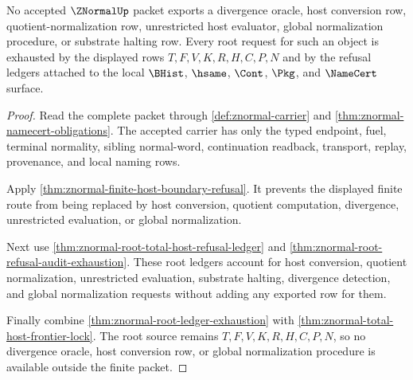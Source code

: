 \begin{theorem}
\label{thm:znormal-root-forbidden-host-conversion-exclusion}
No accepted $\ZNormalUp$ packet exports a divergence oracle, host conversion row, quotient-normalization row, unrestricted host evaluator, global normalization procedure, or substrate halting row. Every root request for such an object is exhausted by the displayed rows $T,F,V,K,R,H,C,P,N$ and by the refusal ledgers attached to the local $\BHist$, $\hsame$, $\Cont$, $\Pkg$, and $\NameCert$ surface.
\end{theorem}
\begin{proof}
Read the complete packet through \autoref{def:znormal-carrier} and \autoref{thm:znormal-namecert-obligations}. The accepted carrier has only the typed endpoint, fuel, terminal normality, sibling normal-word, continuation readback, transport, replay, provenance, and local naming rows.

Apply \autoref{thm:znormal-finite-host-boundary-refusal}. It prevents the displayed finite route from being replaced by host conversion, quotient computation, divergence, unrestricted evaluation, or global normalization.

Next use \autoref{thm:znormal-root-total-host-refusal-ledger} and \autoref{thm:znormal-root-refusal-audit-exhaustion}. These root ledgers account for host conversion, quotient normalization, unrestricted evaluation, substrate halting, divergence detection, and global normalization requests without adding any exported row for them.

Finally combine \autoref{thm:znormal-root-ledger-exhaustion} with \autoref{thm:znormal-total-host-frontier-lock}. The root source remains $T,F,V,K,R,H,C,P,N$, so no divergence oracle, host conversion row, or global normalization procedure is available outside the finite packet.
\end{proof}
